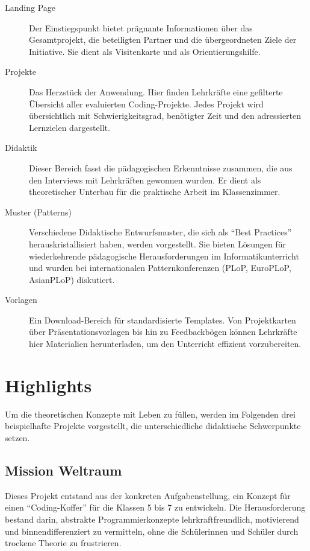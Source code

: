 \documentclass[a5paper,pagesize,10pt,bibtotoc,pointlessnumbers,
normalheadings,DIV=9,twoside=false]{scrbook}
\begin{document}
\begin{description}
    \item[Landing Page] Der Einstiegspunkt bietet prägnante Informationen über das Gesamtprojekt, die beteiligten Partner und die übergeordneten Ziele der Initiative. Sie dient als Visitenkarte und als Orientierungshilfe.
    \item[Projekte] Das Herzstück der Anwendung. Hier finden Lehrkräfte eine gefilterte Übersicht aller evaluierten Coding-Projekte. Jedes Projekt wird übersichtlich mit Schwierigkeitsgrad, benötigter Zeit und den adressierten Lernzielen dargestellt.    
    \item[Didaktik] Dieser Bereich fasst die pädagogischen Erkenntnisse zusammen, die aus den Interviews mit Lehrkräften gewonnen wurden. Er dient als theoretischer Unterbau für die praktische Arbeit im Klassenzimmer.
    \item[Muster (Patterns)] Verschiedene Didaktische Entwurfsmuster, die sich als ``Best Practices'' herauskristallisiert haben, werden vorgestellt. Sie bieten Lösungen für wiederkehrende pädagogische Herausforderungen im Informatikunterricht und wurden bei internationalen Patternkonferenzen (PLoP, EuroPLoP, AsianPLoP) diskutiert.
    \item[Vorlagen] Ein Download-Bereich für standardisierte Templates. Von Projektkarten über Präsentationsvorlagen bis hin zu Feedbackbögen können Lehrkräfte hier Materialien herunterladen, um den Unterricht effizient vorzubereiten.
\end{description}

\section*{Highlights}

Um die theoretischen Konzepte mit Leben zu füllen, werden im Folgenden drei beispielhafte Projekte vorgestellt, die unterschiedliche didaktische Schwerpunkte setzen.

\subsection*{Mission Weltraum}

Dieses Projekt entstand aus der konkreten Aufgabenstellung, ein Konzept für einen ``Coding-Koffer'' für die Klassen 5 bis 7 zu entwickeln. Die Herausforderung bestand darin, abstrakte Programmierkonzepte lehrkraftfreundlich, motivierend und binnendifferenziert zu vermitteln, ohne die Schülerinnen und Schüler durch trockene Theorie zu frustrieren.
\end{document}
